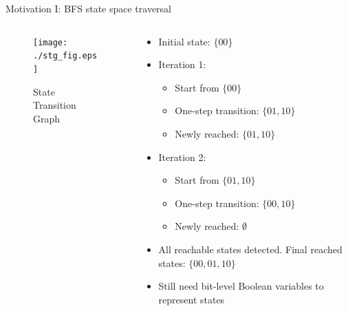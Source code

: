 \documentclass[xcolor=dvipsnames]{beamer}
\newcommand{\bi}{\begin{itemize}}
\newcommand{\ei}{\end{itemize}}
\begin{document}
\begin{frame}[label = linkSTG]{\large{Motivation I: BFS state space traversal}}
\begin{columns}[onlytextwidth]
\begin{column}{0.5\textwidth}
\begin{figure}
\centering
\texttt{[image: ./stg\_fig.eps]}
\caption{State Transition Graph}
\end{figure}
\hyperlink{pptpage2}{}
\end{column}
\begin{column}{0.5\textwidth}
\bi
\item Initial state: $\{00\}$
\item Iteration 1: 
	\bi
	\item Start from $\{00\}$
	\item One-step transition: $\{01,10\}$
	\item Newly reached: $\{01,10\}$
	\ei
\item Iteration 2: 
	\bi
	\item Start from $\{01,10\}$
	\item One-step transition: $\{00,10\}$
	\item Newly reached: $\emptyset$
	\ei
\item All reachable states detected. Final reached states: $\{00,01,10\}$
\pause
\item Still need bit-level Boolean variables to represent states
\ei
\end{column}
\end{columns}

\end{frame}
\end{document}
